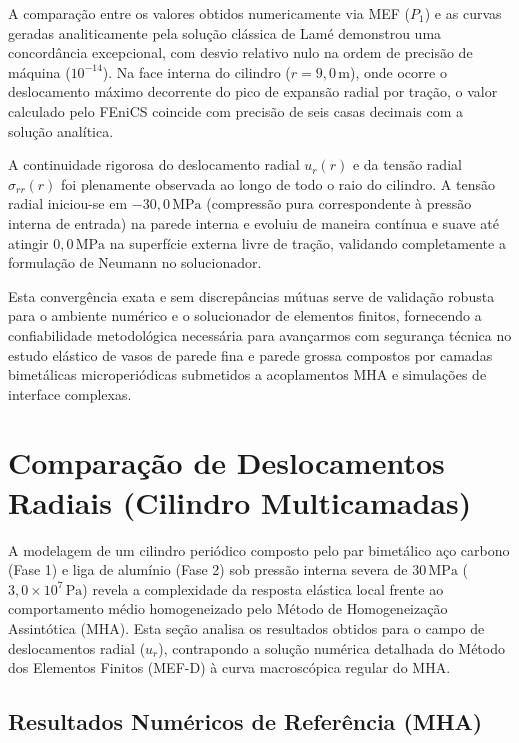 
A comparação entre os valores obtidos numericamente via MEF ($P_1$) e as curvas geradas analiticamente pela solução clássica de Lamé demonstrou uma concordância excepcional, com desvio relativo nulo na ordem de precisão de máquina ($10^{-14}$). Na face interna do cilindro ($r = 9,0 \, \text{m}$), onde ocorre o deslocamento máximo decorrente do pico de expansão radial por tração, o valor calculado pelo FEniCS coincide com precisão de seis casas decimais com a solução analítica.

A continuidade rigorosa do deslocamento radial $u_r (r)$ e da tensão radial $\sigma_{rr}(r)$ foi plenamente observada ao longo de todo o raio do cilindro. A tensão radial iniciou-se em $-30,0 \, \text{MPa}$ (compressão pura correspondente à pressão interna de entrada) na parede interna e evoluiu de maneira contínua e suave até atingir $0,0 \, \text{MPa}$ na superfície externa livre de tração, validando completamente a formulação de Neumann no solucionador.

Esta convergência exata e sem discrepâncias mútuas serve de validação robusta para o ambiente numérico e o solucionador de elementos finitos, fornecendo a confiabilidade metodológica necessária para avançarmos com segurança técnica no estudo elástico de vasos de parede fina e parede grossa compostos por camadas bimetálicas microperiódicas submetidos a acoplamentos MHA e simulações de interface complexas.

\section{Comparação de Deslocamentos Radiais (Cilindro Multicamadas)}\label{sec:comparacao_deslocamentos}

A modelagem de um cilindro periódico composto pelo par bimetálico aço carbono (Fase 1) e liga de alumínio (Fase 2) sob pressão interna severa de $30 \, \text{MPa}$ ($3,0 \times 10^7 \, \text{Pa}$) revela a complexidade da resposta elástica local frente ao comportamento médio homogeneizado pelo Método de Homogeneização Assintótica (MHA). Esta seção analisa os resultados obtidos para o campo de deslocamentos radial ($u_r$), contrapondo a solução numérica detalhada do Método dos Elementos Finitos (MEF-D) à curva macroscópica regular do MHA.

\subsection{Resultados Numéricos de Referência (MHA)}

